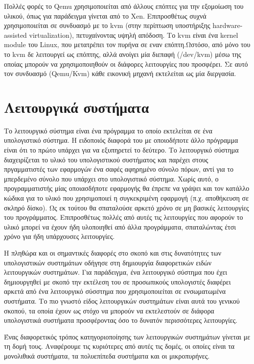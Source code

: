 Πολλές φορές το Qemu χρησιμοποιείται από άλλους επόπτες για την εξομοίωση του
υλικού, όπως για παράδειγμα γίνεται από το Xen. Επιπροσθέτως συχνά
χρησιμοποιείται σε συνδυασμό με το kvm (στην περίπτωση υποστήριξης
hardware-assisted virtualization), πετυχαίνοντας υψηλή απόδοση. Το kvm είναι ένα
kernel module του Linux, που μετατρέπει τον πυρήνα σε εναν επόπτη.Ωστόσο, από
μόνο του το kvm δε λειτουργεί ως επόπτης, αλλά ανοίγει μία διεπαφή (/dev/kvm)
μέσω της οποίας μπορούν να χρησιμοποιηθούν οι διάφορες λειτουργίες που
προσφέρει. Σε αυτό τον συνδυασμό (Qemu/Kvm) κάθε εικονική μηχανή εκτελείται ως
μία διεργασία. 

\section{Λειτουργικά συστήματα}

Το λειτουργικό σύστημα είναι ένα πρόγραμμα το οποίο εκτελείται σε ένα
υπολογιστικό σύστημα. Η ειδοποιός διαφορά του με οποιοδήποτε άλλο πρόγραμμα
είναι ότι το πρώτο υπάρχει για να εξυπηρετεί το δεύτερο. Το λειτουργικό σύστημα
διαχειρίζεται το υλικό του υπολογιστικού συστήματος και παρέχει στους
πργαμματιστές των εφαρμογών ένα σαφές αφηρημένο σύνολο πόρων, αντί για το
μπερδεμένο σύνολο που υπάρχει στο υπολογιστικό σύστημα. Χωρίς αυτό, ο
προγραμματιστής μίας οποιασδήποτε εφαρμογής θα έπρεπε να γράψει και τον κατάλλο
κώδικα για το υλικό που χρησιμοποιεί η συγκεκριμένη εφαρμογή (π.χ. αποθήκευση σε
σκληρό δίσκο). Ως εκ τούτου θα σπαταλούσε αρκετό χρόνο σε μη βασικές λειτουργίες
του προγράμματος. Επιπροσθέτως πολλές από αυτές τις λειτουργίες που αφορούν το
υλικό μπορεί να έχουν ήδη υλοποιηθεί από άλλα προγράμματα, σπαταλώντας έτσι
χρόνο για ήδη υπάρχουσες λειτουργίες. 

Η πληθώρα και οι σημαντικές διαφορές στο σκοπό και στις δυνατότητες των
υπολογιστικών συστημάτων οδήγησε στη δημιουργία διαφορετικών ειδών λειτουργικών
συστημάτων. Για παράδειγμα, ένα λειτουργικό σύστημα που έχει δημιουργηθεί με
σκοπό την εκτέλεση του σε προσωπικούς υπολογιστές διαφέρει αρκετά από ένα
λειτουργικό σύσστημα που χρησιμοποιείται σε ενσωματωμένα συστήματα. Το πιο
γνωστό είδος λειτουργικών συστημάτων είναι αυτά του γενικού σκοπού, τα οποία
έχουν ως στόχο να μπορούν να εκτελεστούν σε διάφορα υπολογιστικά συστήματα
προσφέροντας όσο το δυνατόν περισσότερες λειτουργίες. 

Ένας διαφορετικός τρόπος κατηγοριοποίησης των λειτουργικών συστημάτων γίνεται με
τη δομή τους. Αναφέρουμε τις κυριότερες από αυτές τις δομές, οι οποίες είναι τα
μονολιθικά συστήματα, τα πολυεπίπεδα συστήματα και οι μικροπυρήνες.

